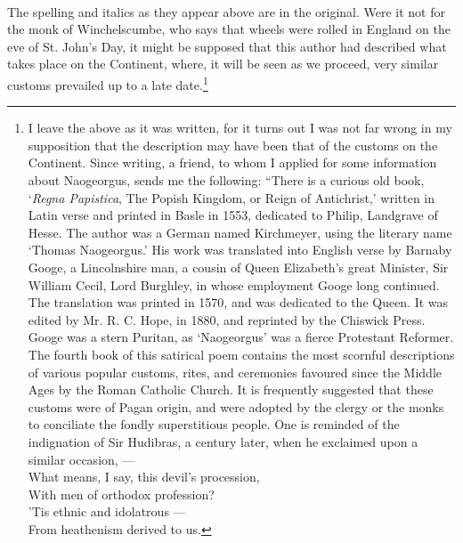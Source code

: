 \documentclass[a4paper, 11pt, oneside, polutonikogreek, english]{article}
\begin{document}
\paragraph{}
The spelling and italics as they appear above are in the original. Were it not for the monk of Winchelscumbe, who says that wheels were rolled in England on the eve of St. John's Day, it might be supposed that this author had described what takes place on the Continent, where, it will be seen as we proceed, very similar customs prevailed up to a late date.\footnote{I leave the above as it was written, for it turns out I was not far wrong in my supposition that the description may have been that of the customs on the Continent. Since writing, a friend, to whom I applied for some information about Naogeorgus, sends me the following: ``There is a curious old book, `\emph{Regna Papistica}, The Popish Kingdom, or Reign of Antichrist,' written in Latin verse and printed in Basle in 1553, dedicated to Philip, Landgrave of Hesse. The author was a German named Kirchmeyer, using the literary name `Thomas Naogeorgus.' His work was translated into English verse by Barnaby Googe, a Lincolnshire man, a cousin of Queen Elizabeth's great Minister, Sir William Cecil, Lord Burghley, in whose employment Googe long continued. The translation was printed in 1570, and was dedicated to the Queen. It was edited by Mr. R. C. Hope, in 1880, and reprinted by the Chiswick Press. Googe was a stern Puritan, as `Naogeorgus' was a fierce Protestant Reformer. The fourth book of this satirical poem contains the most scornful descriptions of various popular customs, rites, and ceremonies favoured since the Middle Ages by the Roman Catholic Church. It is frequently suggested that these customs were of Pagan origin, and were adopted by the clergy or the monks to conciliate the fondly superstitious people. One is reminded of the indignation of Sir Hudibras, a century later, when he exclaimed upon a similar occasion, ---\\\hspace*{10mm}What means, I say, this devil's procession,\\\hspace*{10mm}With men of orthodox profession?\\\hspace*{10mm}'Tis ethnic and idolatrous ---\\\hspace*{10mm}From heathenism derived to us.}
\end{document}
